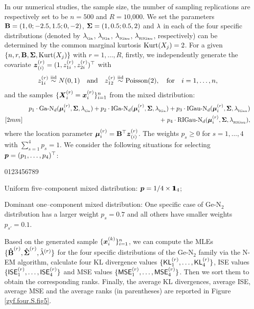 In our numerical studies, the sample size, the number of sampling replications are respectively set to be $n = 500$ and $R = 10$,000. We set the parameters ${\bf B} = (1, 0; -2.5, 1.5; 0, -2)$, ${\mbox{\boldmath$\Sigma$}} = (1, 0.5; 0.5, 2)$ and $\lambda$ in each of the four specific distributions (denoted by ${\lambda}_{_{\textrm{Ga}}}$, ${\lambda}_{_{\textrm{IGa}}}$, ${\lambda}_{_{\textrm{IGau}}}$, ${\lambda}_{_{\textrm{RIGau}}}$, respectively) can be determined by the common marginal kurtosis $\mbox{Kurt}(X_j) = 2$. For a given $\{n, r, {\bf B}, {\mbox{\boldmath$\Sigma$}}, \mbox{Kurt}(X_j)\}$ with $r = 1, \dots, R$, firstly, we independently generate the covariate ${\boldsymbol{z}}_{(i)}^{(r)} = (1, z_{1i}^{(r)}, z_{2i}^{(r)})^\top$ with
$$
    z_{1i}^{(r)} \stackrel{{\rm iid}}{\sim} N(0, 1) \quad \mbox{and} \quad z_{12}^{(r)} \stackrel{{\rm iid}}{\sim} \mbox{Poisson}(2), \quad \mbox{for} \quad i = 1, \dots, n,
$$
and the samples $\{{\boldsymbol{X}}_i^{(r)} = {\boldsymbol{x}}_i^{(r)}\}_{i=1}^n$ from the mixed distribution:
\begin{eqnarray*}
    && p_1 \cdot \mbox{Ga-N}_d({\boldsymbol{\mu}}_i^{(r)}, {\mbox{\boldmath$\Sigma$}}, {\lambda}_{_{\textrm{Ga}}}) + p_2 \cdot \mbox{IGa-N}_d({\boldsymbol{\mu}}_i^{(r)}, {\mbox{\boldmath$\Sigma$}}, {\lambda}_{_{\textrm{IGa}}}) + p_3 \cdot \mbox{IGau-N}_d({\boldsymbol{\mu}}_i^{(r)}, {\mbox{\boldmath$\Sigma$}}, {\lambda}_{_{\textrm{IGau}}}) \\ [2mm]
    && +\; p_4 \cdot \mbox{RIGau-N}_d({\boldsymbol{\mu}}_i^{(r)}, {\mbox{\boldmath$\Sigma$}}, {\lambda}_{_{\textrm{RIGau}}}),
\end{eqnarray*}
where the location parameter ${\boldsymbol{\mu}}_i^{(r)} = {\bf B}^\top {\boldsymbol{z}}_{(i)}^{(r)}$. The weights $p_s \ge 0$ for $s = 1, \dots, 4$ with $\sum_{s=1}^4 p_s = 1$. We consider the following situations for selecting ${\boldsymbol{p}} = (p_1, \dots, p_4)^\top$:
\begin{namelist}{0123456789}
\item[\hspace*{-0.05cm} Case (C$_3$):] Uniform five--component mixed distribution: ${\boldsymbol{p}}=1/4\times{\bf 1}\!\!\!{\bf 1}_4$;

\item[\hspace*{-0.05cm} Case (C$_4$):] Dominant one--component mixed distribution: One specific case of Ge-N$_2$ distribution has a larger weight $p_s = 0.7$ and all others have smaller weights $p_{s'} = 0.1$.
\end{namelist}

Based on the generated sample $\{{\boldsymbol{x}}_i^{(k)} \}_{i=1}^n$, we can compute the MLEs $\{\boldsymbol{\hat{\rm B}}^{(r)}, \boldsymbol{\hat{\Sigma}}^{(r)}, \hat{\lambda}^{(r)}\}$ for the four specific distributions of the Ge-N$_2$ family via the N-EM algorithm, calculate four KL divergence values $\{\textsf{KL}_1^{(r)}, \dots, \textsf{KL}_4^{(r)}\}$, ISE values $\{\textsf{ISE}_1^{(r)}, \dots, \textsf{ISE}_4^{(r)}\}$ and MSE values $\{\textsf{MSE}_1^{(r)}, \dots, \textsf{MSE}_4^{(r)}\}$. Then we sort them to obtain the corresponding ranks. Finally, the average KL divergences, average ISE, average MSE and the average ranks (in parentheses) are reported in Figure \ref{zyf.four.S.fig5}.

